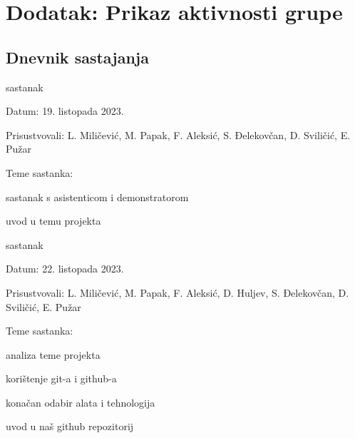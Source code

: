 \chapter*{Dodatak: Prikaz aktivnosti grupe}
		
		\section*{Dnevnik sastajanja}
		
		
		\begin{packed_enum}
			\item  sastanak
			\item[] \begin{packed_item}
				\item Datum: 19. listopada 2023.
				\item Prisustvovali: L. Miličević, M. Papak, F. Aleksić, S. Đelekovčan, D. Sviličić, E. Pužar
				\item Teme sastanka:
				\begin{packed_item}
					\item  sastanak s asistenticom i demonstratorom
					\item  uvod u temu projekta
				\end{packed_item}
			\end{packed_item}

			\item  sastanak
			\item[] \begin{packed_item}
				\item Datum: 22. listopada 2023.
				\item Prisustvovali: L. Miličević, M. Papak, F. Aleksić, D. Huljev, S. Đelekovčan, D. Sviličić, E. Pužar
				\item Teme sastanka:
				\begin{packed_item}
					\item  analiza teme projekta
					\item  korištenje git-a i github-a
					\item  konačan odabir alata i tehnologija
					\item  uvod u naš github repozitorij
				\end{packed_item}
			\end{packed_item}
			

\end{packed_enum}
